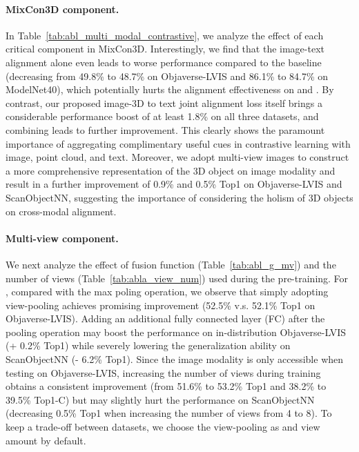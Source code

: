 \documentclass{article} \usepackage{iclr2024_conference,times}
\newcommand{\ourmethod}{MixCon3D}
\begin{document}
\paragraph{MixCon3D component.}
In Table~\ref{tab:abl_multi_modal_contrastive}, we analyze the effect of each critical component in \ourmethod. 
Interestingly, we find that the image-text alignment alone even leads to worse performance compared to the baseline (decreasing from 49.8\% to 48.7\% on Objaverse-LVIS and 86.1\% to 84.7\% on ModelNet40), which potentially hurts the alignment effectiveness on  and .  
By contrast, our proposed image-3D to text joint alignment loss  itself brings a considerable performance boost of at least 1.8\% on all three datasets, and combining  leads to further improvement. 
This clearly shows the paramount importance of aggregating complimentary useful cues in contrastive learning with image, point cloud, and text. 
Moreover, we adopt multi-view images to construct a more comprehensive representation of the 3D object on image modality and result in a further improvement of 0.9\% and 0.5\% Top1 on Objaverse-LVIS and ScanObjectNN, suggesting the importance of considering the holism of 3D objects on cross-modal alignment.

\paragraph{Multi-view component.}
We next analyze the effect of fusion function  (Table~\ref{tab:abl_g_mv}) and the number of views (Table~\ref{tab:abla_view_num}) used during the pre-training.
For , compared with the max poling operation, we observe that simply adopting view-pooling achieves promising improvement (52.5\% v.s. 52.1\% Top1 on Objaverse-LVIS). 
Adding an additional fully connected layer (FC) after the pooling operation may boost the performance on in-distribution Objaverse-LVIS (+ 0.2\% Top1) while severely lowering the generalization ability on ScanObjectNN (- 6.2\% Top1). 
Since the image modality is only accessible when testing on Objaverse-LVIS, increasing the number of views during training obtains a consistent improvement (from 51.6\% to 53.2\% Top1 and 38.2\% to 39.5\% Top1-C) but may slightly hurt the performance on ScanObjectNN (decreasing 0.5\% Top1 when increasing the number of views from 4 to 8).
To keep a trade-off between datasets, we choose the view-pooling as  and view amount  by default.
\end{document}
